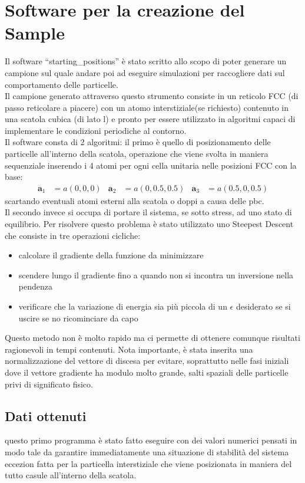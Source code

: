 \documentclass[a4paper,11pt]{article}
\begin{document}
	\section{Software per la creazione del Sample} %
	\label{sec:software_per_la_creazione_del_sample}
		Il software ``starting\_positions'' è stato scritto allo scopo di poter 
		generare un campione sul quale andare poi ad eseguire simulazioni per
		raccogliere dati sul comportamento delle particelle.\\
		Il campione generato attraverso questo strumento consiste in un reticolo
		FCC (di passo reticolare a piacere) con un atomo interstiziale(se 
		richiesto) contenuto in una scatola cubica (di lato l) e pronto per
		essere utilizzato in algoritmi capaci di implementare le condizioni 
		periodiche al contorno.\\
		Il software consta di 2 algoritmi: il primo è quello di posizionamento 
		delle particelle all'interno della scatola, operazione che viene svolta
		in maniera sequenziale inserendo i 4 atomi per ogni cella unitaria nelle 
		posizioni FCC con la base:
		\begin{align}
			\mathbf a_1  &= a(0,0,0) & 
			\mathbf a_2  &= a(0,0.5,0.5) &
			\mathbf a_3  &= a(0.5,0,0.5) 
		\end{align}
		scartando eventuali atomi esterni alla scatola o doppi a causa delle pbc.\\
		Il secondo invece si occupa di portare il sistema, se sotto stress, ad uno 
		stato di equilibrio. Per risolvere questo problema è stato utilizzato uno 
		Steepest Descent che consiste in tre operazioni cicliche: 
		\begin{itemize}
			\item calcolare il gradiente della funzione da minimizzare
			\item scendere lungo il gradiente fino a quando non si incontra un inversione nella pendenza
			\item verificare che la variazione di energia sia più piccola di un $\epsilon$ desiderato se si uscire se no ricominciare da capo
		\end{itemize}
	    Questo metodo non è molto rapido ma ci permette di ottenere comunque
	    risultati ragionevoli in tempi contenuti.
	    Nota importante, è stata inserita una normalizzazione del vettore di discesa
	    per evitare, soprattutto nelle fasi iniziali dove il vettore gradiente ha 
	    modulo molto grande, salti spaziali delle particelle privi di significato fisico.
	\subsection{Dati ottenuti} %
	\label{sub:dati_ottenuti}
		questo primo programma è stato fatto eseguire con dei valori numerici 
		pensati in modo tale da garantire immediatamente una situazione di stabilità
		del sistema eccezion fatta per la particella interstiziale che viene posizionata in maniera del tutto casule all'interno della scatola.
\end{document}
